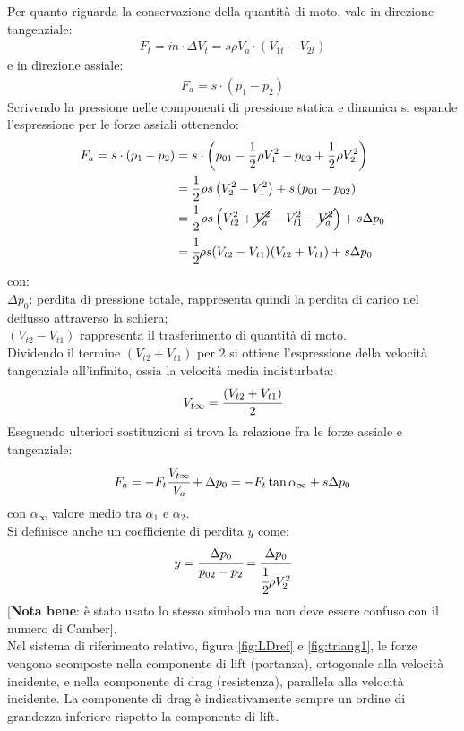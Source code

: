 Per quanto riguarda la conservazione della quantità di moto, vale in direzione tangenziale:
\begin{align*}
F_t= \dot{m} \cdot \Delta V_t = s \rho	V_a \cdot (V_{1t}-V_{2t})
\end{align*}
e in direzione assiale:
\begin{align*}
F_a = s \cdot (p_1 - p_2)
\end{align*}
Scrivendo la pressione nelle componenti di pressione statica e dinamica si espande l'espressione per le forze assiali ottenendo:
\begin{align*}
F_a = s \cdot ( p_1 - p_2) &= s \cdot \left( p_{01} - \frac{1}{2} \rho V_1^2 - p_{02} + \frac{1}{2} \rho V_2^2 \right)\\
&= \frac{1}{2} \rho s \left( V_2^2 - V_1^2 \right) + s \left( p_{01} - p_{02} \right)\\
&= \frac{1}{2} \rho s \left( V_{t2}^2 + \cancel{V_a^2} - V_{t1}^2- \cancel{V_a^2} \right) + s \Delta p_0\\
&=\cfrac{1}{2} \rho s (V_{t2}-V_{t1}) (V_{t2}+V_{t1}) + s \Delta p_0
\end{align*}
con:\\[1mm]
$\Delta p_0$: perdita di pressione totale, rappresenta quindi la perdita di carico nel deflusso attraverso la schiera; \\
$(V_{t2}-V_{t1})$ rappresenta il trasferimento di quantità di moto. \\[2mm]
Dividendo il termine $(V_{t2}+V_{t1})$ per $2$ si ottiene l'espressione della velocità tangenziale all'infinito, ossia la velocità media indisturbata:
\begin{align*}
V_{t \infty}=\cfrac{(V_{t2}+V_{t1})}{2}
\end{align*}
Eseguendo ulteriori sostituzioni si trova la relazione fra le forze assiale e tangenziale:
\begin{align*}
F_a = -F_t \cfrac{V_{t \infty}}{V_a} + \Delta p_0 = - F_t \tan \alpha_{\infty} + s \Delta p_0
\end{align*}
con $\alpha_{\infty}$ valore medio tra $\alpha_1$ e $\alpha_2$.\\
Si definisce anche un coefficiente di perdita $y$ come:
\begin{align*}
y = \cfrac{\Delta p_0}{p_{02}-p_2} = \cfrac{\Delta p_0}{\cfrac{1}{2} \rho V_2^2}
\end{align*}
[\textbf{Nota bene}: è stato usato lo stesso simbolo ma non deve essere confuso con il numero di Camber].\\
Nel sistema di riferimento relativo, figura \ref{fig:LDref} e \ref{fig:triang1}, le forze vengono scomposte nella componente di lift (portanza), ortogonale alla velocità incidente, e nella componente di drag (resistenza), parallela alla velocità incidente. La componente di drag è indicativamente sempre un ordine di grandezza inferiore rispetto la componente di lift.
